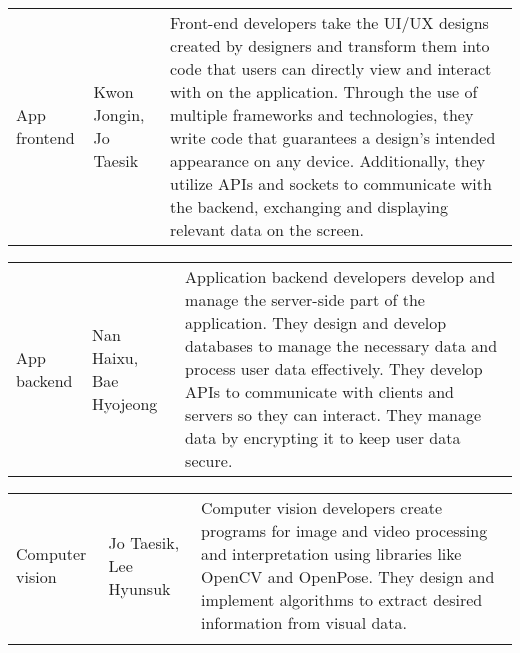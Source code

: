 \begin{enumerate}[label=\arabic*]
          \begin{table}[H]
              \center
              \begin{tabular}{m{1.4cm} m{1.5cm} m{4cm}}
                  App frontend & Kwon Jongin, Jo Taesik & Front-end developers take the UI/UX designs created by designers and transform them into code that users can directly view and interact with on the application. Through the use of multiple frameworks and technologies, they write code that guarantees a design’s intended appearance on any device. Additionally, they utilize APIs and sockets to communicate with the backend, exchanging and displaying relevant data on the screen. \\
              \end{tabular}
          \end{table}

          \begin{table}[H]
              \center
              \begin{tabular}{m{1.4cm} m{1.5cm} m{4cm}}
                  App backend & Nan Haixu, Bae Hyojeong & Application backend developers develop and manage the server-side part of the application. They design and develop databases to manage the necessary data and process user data effectively. They develop APIs to communicate with clients and servers so they can interact. They manage data by encrypting it to keep user data secure. \\
              \end{tabular}
          \end{table}

          \begin{table}[H]
              \center
              \begin{tabular}{m{1.4cm} m{1.5cm} m{4cm}}
                  Computer vision & Jo Taesik, Lee Hyunsuk & Computer vision developers create programs for image and video processing and interpretation using libraries like OpenCV and OpenPose. They design and implement algorithms to extract desired information from visual data. \\\\
                  \bottomrule
              \end{tabular}
          \end{table}


\end{enumerate}
